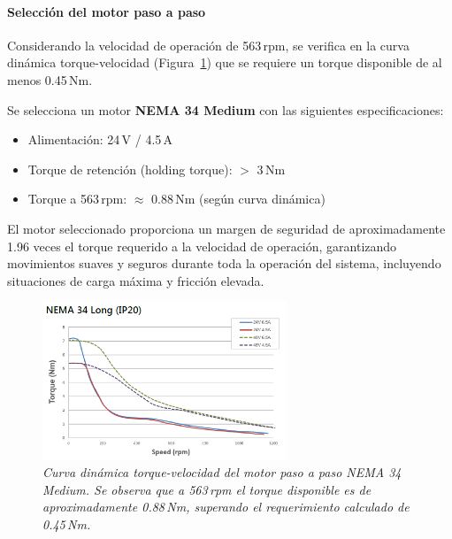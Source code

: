 \paragraph{Selección del motor paso a paso}
Considerando la velocidad de operación de 563\,rpm, se verifica en la curva dinámica torque-velocidad (Figura~\ref{fig:Curva_din_nema34}) que se requiere un torque disponible de al menos 0.45\,Nm.

Se selecciona un motor \textbf{NEMA 34 Medium} con las siguientes especificaciones:
\begin{itemize}
    \item Alimentación: 24\,V / 4.5\,A
    \item Torque de retención (holding torque): $>$ 3\,Nm
    \item Torque a 563\,rpm: $\approx$ 0.88\,Nm (según curva dinámica)
\end{itemize}

El motor seleccionado proporciona un margen de seguridad de aproximadamente 1.96 veces el torque requerido a la velocidad de operación, garantizando movimientos suaves y seguros durante toda la operación del sistema, incluyendo situaciones de carga máxima y fricción elevada.

\begin{figure}[H]
    \centering
    \includegraphics[width=0.65\textwidth]{img/Nema34.png}
    \caption{\textit{Curva dinámica torque-velocidad del motor paso a paso NEMA 34 Medium. Se observa que a 563\,rpm el torque disponible es de aproximadamente 0.88\,Nm, superando el requerimiento calculado de 0.45\,Nm.}}
    \label{fig:Curva_din_nema34}
\end{figure}